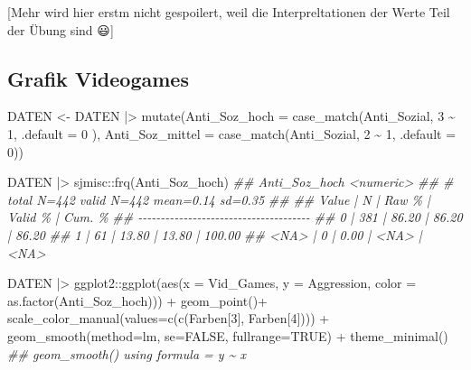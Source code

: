 \documentclass[
  10pt,
  letterpaper,
  a4paper, twoside]{scrreprt}
\newenvironment{Shaded}{\begin{snugshade}}{\end{snugshade}}
\newcommand{\AttributeTok}[1]{\textcolor[rgb]{0.40,0.45,0.13}{#1}}
\newcommand{\ConstantTok}[1]{\textcolor[rgb]{0.56,0.35,0.01}{#1}}
\newcommand{\DecValTok}[1]{\textcolor[rgb]{0.68,0.00,0.00}{#1}}
\newcommand{\DocumentationTok}[1]{\textcolor[rgb]{0.37,0.37,0.37}{\textit{#1}}}
\newcommand{\FunctionTok}[1]{\textcolor[rgb]{0.28,0.35,0.67}{#1}}
\newcommand{\NormalTok}[1]{\textcolor[rgb]{0.00,0.23,0.31}{#1}}
\newcommand{\OtherTok}[1]{\textcolor[rgb]{0.00,0.23,0.31}{#1}}
\newcommand{\SpecialCharTok}[1]{\textcolor[rgb]{0.37,0.37,0.37}{#1}}
\begin{document}
{[}Mehr wird hier erstm nicht gespoilert, weil die Interpreltationen der
Werte Teil der Übung sind 😃{]}

\subsection{Grafik Videogames}\label{grafik-videogames}

\begin{Shaded}
\begin{Highlighting}[]
\NormalTok{DATEN }\OtherTok{\textless{}{-}}\NormalTok{ DATEN  }\SpecialCharTok{|\textgreater{}}
  \FunctionTok{mutate}\NormalTok{(}\AttributeTok{Anti\_Soz\_hoch =} \FunctionTok{case\_match}\NormalTok{(Anti\_Sozial,}
   \DecValTok{3} \SpecialCharTok{\textasciitilde{}} \DecValTok{1}\NormalTok{,}
   \AttributeTok{.default =} \DecValTok{0}
\NormalTok{  ), }
  \AttributeTok{Anti\_Soz\_mittel =} \FunctionTok{case\_match}\NormalTok{(Anti\_Sozial, }
  \DecValTok{2} \SpecialCharTok{\textasciitilde{}} \DecValTok{1}\NormalTok{, }
  \AttributeTok{.default =} \DecValTok{0}\NormalTok{))}

\NormalTok{DATEN  }\SpecialCharTok{|\textgreater{}}\NormalTok{ sjmisc}\SpecialCharTok{::}\FunctionTok{frq}\NormalTok{(Anti\_Soz\_hoch)}
\DocumentationTok{\#\# Anti\_Soz\_hoch \textless{}numeric\textgreater{} }
\DocumentationTok{\#\# \# total N=442 valid N=442 mean=0.14 sd=0.35}
\DocumentationTok{\#\# }
\DocumentationTok{\#\# Value |   N | Raw \% | Valid \% | Cum. \%}
\DocumentationTok{\#\# {-}{-}{-}{-}{-}{-}{-}{-}{-}{-}{-}{-}{-}{-}{-}{-}{-}{-}{-}{-}{-}{-}{-}{-}{-}{-}{-}{-}{-}{-}{-}{-}{-}{-}{-}{-}{-}{-}}
\DocumentationTok{\#\#     0 | 381 | 86.20 |   86.20 |  86.20}
\DocumentationTok{\#\#     1 |  61 | 13.80 |   13.80 | 100.00}
\DocumentationTok{\#\#  \textless{}NA\textgreater{} |   0 |  0.00 |    \textless{}NA\textgreater{} |   \textless{}NA\textgreater{}}

\NormalTok{DATEN  }\SpecialCharTok{|\textgreater{}}
\NormalTok{  ggplot2}\SpecialCharTok{::}\FunctionTok{ggplot}\NormalTok{(}\FunctionTok{aes}\NormalTok{(}\AttributeTok{x =}\NormalTok{ Vid\_Games, }\AttributeTok{y =}\NormalTok{ Aggression, }
                \AttributeTok{color =} \FunctionTok{as.factor}\NormalTok{(Anti\_Soz\_hoch))) }\SpecialCharTok{+}
  \FunctionTok{geom\_point}\NormalTok{()}\SpecialCharTok{+} 
  \FunctionTok{scale\_color\_manual}\NormalTok{(}\AttributeTok{values=}\FunctionTok{c}\NormalTok{(}\FunctionTok{c}\NormalTok{(Farben[}\DecValTok{3}\NormalTok{], Farben[}\DecValTok{4}\NormalTok{]))) }\SpecialCharTok{+} 
  \FunctionTok{geom\_smooth}\NormalTok{(}\AttributeTok{method=}\NormalTok{lm, }\AttributeTok{se=}\ConstantTok{FALSE}\NormalTok{, }\AttributeTok{fullrange=}\ConstantTok{TRUE}\NormalTok{) }\SpecialCharTok{+} 
  \FunctionTok{theme\_minimal}\NormalTok{()}
\DocumentationTok{\#\# \textasciigrave{}geom\_smooth()\textasciigrave{} using formula = \textquotesingle{}y \textasciitilde{} x\textquotesingle{}}
\end{Highlighting}
\end{Shaded}
\end{document}
